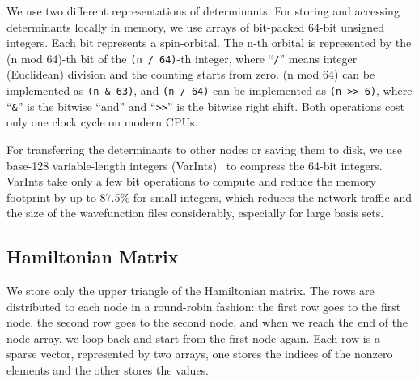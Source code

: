 \documentclass[%
reprint,
 superscriptaddress,
 amsmath,amssymb,
 aps,
]{revtex4-1}
\begin{document}
We use two different representations of determinants.
For storing and accessing determinants locally in memory, we use arrays of bit-packed 64-bit unsigned integers.
Each bit represents a spin-orbital.
The n-th orbital is represented by the (n mod 64)-th bit of
the \lstinline{(n / 64)}-th integer, where ``\lstinline{/}'' means integer (Euclidean) division and the counting starts from zero.
(n mod 64) can be implemented as \lstinline{(n & 63)}, and \lstinline{(n / 64)} can be implemented as \lstinline{(n >> 6)},
where ``\lstinline{&}'' is the bitwise ``and'' and ``\lstinline{>>}'' is the bitwise right shift.
Both operations cost only one clock cycle on modern CPUs.

For transferring the determinants to other nodes or saving them to disk, we use base-128 variable-length integers
(VarInts)~\cite{StuFer-Protobuf-12} to compress the 64-bit integers.
VarInts take only a few bit operations to compute and reduce the memory footprint by up to 87.5\% for small integers, which reduces the network traffic and the size of the wavefunction files considerably, especially for large basis sets.

\subsection{Hamiltonian Matrix}

We store only the upper triangle of the Hamiltonian matrix.
The rows are distributed to each node in a round-robin fashion: the first row goes to the first node, the second row goes to the second node,
and when we reach the end of the node array, we loop back and start from the first node again.
Each row is a sparse vector, represented by two arrays, one stores the indices of the nonzero elements and the other stores the values.
\end{document}
